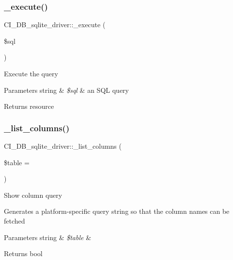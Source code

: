 \subsubsection{\texorpdfstring{\+\_\+execute()}{\_execute()}}
{\footnotesize\ttfamily C\+I\+\_\+\+D\+B\+\_\+sqlite\+\_\+driver\+::\+\_\+execute (\begin{DoxyParamCaption}\item[{}]{\$sql }\end{DoxyParamCaption})\hspace{0.3cm}{\ttfamily [protected]}}

Execute the query


\begin{DoxyParams}[1]{Parameters}
string & {\em \$sql} & an S\+QL query \\
\hline
\end{DoxyParams}
\begin{DoxyReturn}{Returns}
resource 
\end{DoxyReturn}
\mbox{\label{class_c_i___d_b__sqlite__driver_a6b7d9d257c337ba9a60b46d0e4a8199f}} 
\subsubsection{\texorpdfstring{\+\_\+list\+\_\+columns()}{\_list\_columns()}}
{\footnotesize\ttfamily C\+I\+\_\+\+D\+B\+\_\+sqlite\+\_\+driver\+::\+\_\+list\+\_\+columns (\begin{DoxyParamCaption}\item[{}]{\$table = {\ttfamily \textquotesingle{}\textquotesingle{}} }\end{DoxyParamCaption})\hspace{0.3cm}{\ttfamily [protected]}}

Show column query

Generates a platform-\/specific query string so that the column names can be fetched


\begin{DoxyParams}[1]{Parameters}
string & {\em \$table} & \\
\hline
\end{DoxyParams}
\begin{DoxyReturn}{Returns}
bool 
\end{DoxyReturn}
\mbox{\label{class_c_i___d_b__sqlite__driver_ade4d96175818246a9ff08fb8179103c1}} 

